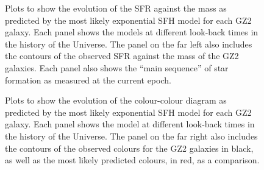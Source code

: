 \documentclass{mn2e}
\begin{document}
\begin{figure}
\caption{Plots to show the evolution of the SFR against the mass as predicted by the most likely exponential SFH model for each GZ2 galaxy. Each panel shows the models at different look-back times in the history of the Universe. The panel on the far left also includes the contours of the observed SFR against the mass of the GZ2 galaxies. Each panel also shows the ``main sequence'' of star formation as measured at the current epoch.}
\label{sfr_mass_evo}
\end{figure}

\begin{figure}
\caption{Plots to show the evolution of the colour-colour diagram as predicted by the most likely exponential SFH model for each GZ2 galaxy. Each panel shows the model at different look-back times in the history of the Universe. The panel on the far right also includes the contours of the observed colours for the GZ2 galaxies in black, as well as the most likely predicted colours, in red, as a comparison.}
\label{c_c_evo}
\end{figure}
\end{document}
